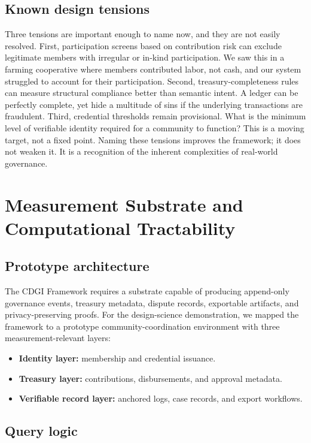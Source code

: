 \documentclass[sigconf]{acmart}
\begin{document}
\subsection{Known design tensions}

Three tensions are important enough to name now, and they are not easily resolved. First, participation screens based on contribution risk can exclude legitimate members with irregular or in-kind participation. We saw this in a farming cooperative where members contributed labor, not cash, and our system struggled to account for their participation. Second, treasury-completeness rules can measure structural compliance better than semantic intent. A ledger can be perfectly complete, yet hide a multitude of sins if the underlying transactions are fraudulent. Third, credential thresholds remain provisional. What is the minimum level of verifiable identity required for a community to function? This is a moving target, not a fixed point. Naming these tensions improves the framework; it does not weaken it. It is a recognition of the inherent complexities of real-world governance.

\section{Measurement Substrate and Computational Tractability}

\subsection{Prototype architecture}

The CDGI Framework requires a substrate capable of producing append-only governance events, treasury metadata, dispute records, exportable artifacts, and privacy-preserving proofs. For the design-science demonstration, we mapped the framework to a prototype community-coordination environment with three measurement-relevant layers:

\begin{itemize}
\item \textbf{Identity layer:} membership and credential issuance.
\item \textbf{Treasury layer:} contributions, disbursements, and approval metadata.
\item \textbf{Verifiable record layer:} anchored logs, case records, and export workflows.
\end{itemize}

\subsection{Query logic}
\end{document}
